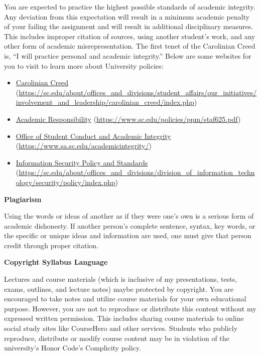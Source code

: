 \documentclass[11pt,letterpaper]{article}
\begin{document}
You are expected to practice the highest possible standards of academic integrity. Any deviation from this expectation will result in a minimum academic penalty of your failing the assignment and will result in additional disciplinary measures. This includes improper citation of sources, using another student's work, and any other form of academic misrepresentation. The first tenet of the Carolinian Creed is, ``I will practice personal and academic integrity.'' Below are some websites for you to visit to learn more about University policies:
	\begin{itemize}
	\item \href{https://sc.edu/about/offices\_and\_divisions/student\_affairs/our\_initiatives/involvement\_and\_leadership/carolinian\_creed/index.php}{Carolinian Creed} (\url{https://sc.edu/about/offices\_and\_divisions/student\_affairs/our\_initiatives/involvement\_and\_leadership/carolinian\_creed/index.php})
	\item \href{https://www.sc.edu/policies/ppm/staf625.pdf}{Academic Responsibility} (\url{https://www.sc.edu/policies/ppm/staf625.pdf})
	\item \href{https://www.sa.sc.edu/academicintegrity/}{Office of Student Conduct and Academic Integrity} (\url{https://www.sa.sc.edu/academicintegrity/})
	\item \href{https://sc.edu/about/offices\_and\_divisions/division\_of\_information\_technology/security/policy/index.php}{Information Security Policy and Standards} (\url{https://sc.edu/about/offices\_and\_divisions/division\_of\_information\_technology/security/policy/index.php})
	\end{itemize} \pvspace{0.1cm}

{\bfseries Plagiarism} \par
Using the words or ideas of another as if they were one's own is a serious form of academic dishonesty. If another person’s complete sentence, syntax, key words, or the specific or unique ideas and information are used, one must give that person credit through proper citation. \par\vspace{0.3cm}

{\bfseries Copyright Syllabus Language} \par
Lectures and course materials (which is inclusive of my presentations, tests, exams, outlines, and lecture notes) maybe protected by copyright. You are encouraged to take notes and utilize course materials for your own educational purpose. However, you are not to reproduce or distribute this content without my expressed written permission. This includes sharing course materials to online social study sites like CourseHero and other services. Students who publicly reproduce, distribute or modify course content may be in violation of the university's Honor Code’s Complicity policy. \par\vspace{0.3cm}
\end{document}
